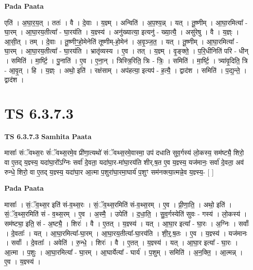 \documentclass[17pt]{extarticle}
\begin{document}
\textbf{Pada Paata} \newline

एति॑ । अ॒घा॒र॒य॒त् । ततः॑ । वै । दे॒वाः । य॒ज्ञ्म् । अन्विति॑ । अ॒प॒श्य॒न्न् । यत् । तू॒ष्णीम् । आ॒घा॒रमित्या᳚ - घा॒रम् । आ॒घा॒रय॒तीत्या᳚ - घा॒रय॑ति । य॒ज्ञ्स्य॑ । अनु॑ख्यात्या॒ इत्यनु॑ - ख्या॒त्यै॒ । असु॑रेषु । वै । य॒ज्ञ्ः । आ॒सी॒त् । तम् । दे॒वाः । तू॒ष्णीꣳ॒॒हो॒मेनेति॑ तूष्णीम्-हो॒मेन॑ । अ॒वृ॒ञ्ज॒त॒ । यत् । तू॒ष्णीम् । आ॒घा॒रमित्या᳚ - घा॒रम् । आ॒घा॒रय॒तीत्या᳚ - घा॒रय॑ति । भ्रातृ॑व्यस्य । ए॒व । तत् । य॒ज्ञ्म् । वृ॒ङ्क्ते॒ । प॒रि॒धीनिति॑ परि - धीन् । समिति॑ । मा॒र्ष्टि॒ । पु॒नाति॑ । ए॒व । ए॒ना॒न् । त्रिस्त्रि॒रिति॒ त्रिः - त्रिः॒ । समिति॑ । मा॒र्ष्टि॒ । त्र्या॑वृ॒दिति॒ त्रि - आ॒वृ॒त् । हि । य॒ज्ञ्ः । अथो॒ इति॑ । रक्ष॑साम् । अप॑हत्या॒ इत्यप॑ - ह॒त्यै॒ । द्वाद॑श । समिति॑ । प॒द्य॒न्ते॒ । द्वाद॑श ।  \newline





\section{ TS 6.3.7.3 }

\textbf{TS 6.3.7.3 } \newline
\textbf{Samhita Paata} \newline

मासाः᳚ संॅवथ्स॒रः सं॑ॅवथ्स॒रमे॒व प्री॑णा॒त्यथो॑ संॅवथ्स॒रमे॒वास्मा॒ उप॑ दधाति सुव॒र्गस्य॑ लो॒कस्य॒ सम॑ष्ट्यै॒ शिरो॒ वा ए॒तद् य॒ज्ञ्स्य॒ यदा॑घा॒रो᳚ऽग्निः सर्वा॑ दे॒वता॒ यदा॑घा॒र-मा॑घा॒रय॑ति शीर्.ष॒त ए॒व य॒ज्ञ्स्य॒ यज॑मानः॒ सर्वा॑ दे॒वता॒ अव॑ रुन्धे॒ शिरो॒ वा ए॒तद् य॒ज्ञ्स्य॒ यदा॑घा॒र आ॒त्मा प॒शुरा॑घा॒रमा॒घार्य॑ प॒शुꣳ सम॑नक्त्या॒त्मन्ने॒व य॒ज्ञ्स्य॒- [  ] \newline

\textbf{Pada Paata} \newline

मासाः᳚ । सं॒ॅव॒थ्स॒र इति॑ सं-व॒थ्स॒रः । सं॒ॅव॒थ्स॒रमिति॑ सं-व॒थ्स॒रम् । ए॒व । प्री॒णा॒ति॒ । अथो॒ इति॑ । सं॒ॅव॒थ्स॒रमिति॑ सं - व॒थ्स॒रम् । ए॒व । अ॒स्मै॒ । उपेति॑ । द॒धा॒ति॒ । सु॒व॒र्गस्येति॑ सुवः - गस्य॑ । लो॒कस्य॑ । सम॑ष्ट्या॒ इति॒ सं - अ॒ष्ट्यै॒ । शिरः॑ । वै । ए॒तत् । य॒ज्ञ्स्य॑ । यत् । आ॒घा॒र इत्या᳚ - घा॒रः । अ॒ग्निः । सर्वाः᳚ । दे॒वताः᳚ । यत् । आ॒घा॒रमित्या᳚-घा॒रम् । आ॒घा॒रय॒तीत्या᳚-घा॒रय॑ति । शी॒र्॒.ष॒तः । ए॒व । य॒ज्ञ्स्य॑ । यज॑मानः । सर्वाः᳚ । दे॒वताः᳚ । अवेति॑ । रु॒न्धे॒ । शिरः॑ । वै । ए॒तत् । य॒ज्ञ्स्य॑ । यत् । आ॒घा॒र इत्या᳚ - घा॒रः । आ॒त्मा । प॒शुः । आ॒घा॒रमित्या᳚ - घा॒रम् । आ॒घार्येत्या᳚ - घार्य॑ । प॒शुम् । समिति॑ । अ॒न॒क्ति॒ । आ॒त्मन्न् । ए॒व । य॒ज्ञ्स्य॑ ।  \newline
\end{document}
